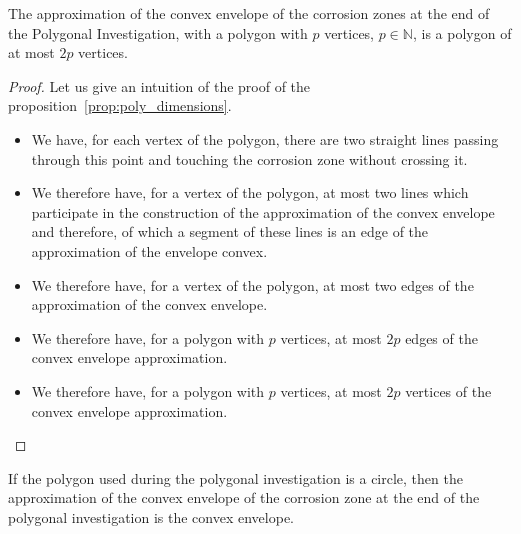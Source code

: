 \documentclass[english,RandD]{rapportPFE}  %
\begin{document}
				\begin{Proposition}
					The approximation of the convex envelope of the corrosion zones at the end of the Polygonal Investigation, with a polygon with $p$ vertices, $p \in \mathbb{N}$, is a polygon of at most $2 p$ vertices.
					\label{prop:poly_dimensions}
				\end{Proposition}
				\begin{proof}
					Let us give an intuition of the proof of the proposition~\ref{prop:poly_dimensions}.
					\begin{itemize}
						\item We have, for each vertex of the polygon, there are two straight lines passing through this point and touching the corrosion zone without crossing it.
						\item We therefore have, for a vertex of the polygon, at most two lines which participate in the construction of the approximation of the convex envelope and therefore, of which a segment of these lines is an edge of the approximation of the envelope convex.
						\item We therefore have, for a vertex of the polygon, at most two edges of the approximation of the convex envelope.
						\item We therefore have, for a polygon with $p$ vertices, at most $2p$ edges of the convex envelope approximation.
						\item We therefore have, for a polygon with $p$ vertices, at most $2p$ vertices of the convex envelope approximation.
					\end{itemize}
				\end{proof}

				\begin{Conjecture}
					If the polygon used during the polygonal investigation is a circle, then the approximation of the convex envelope of the corrosion zone at the end of the polygonal investigation is the convex envelope.
					\label{prop:circle}
				\end{Conjecture}
\end{document}
